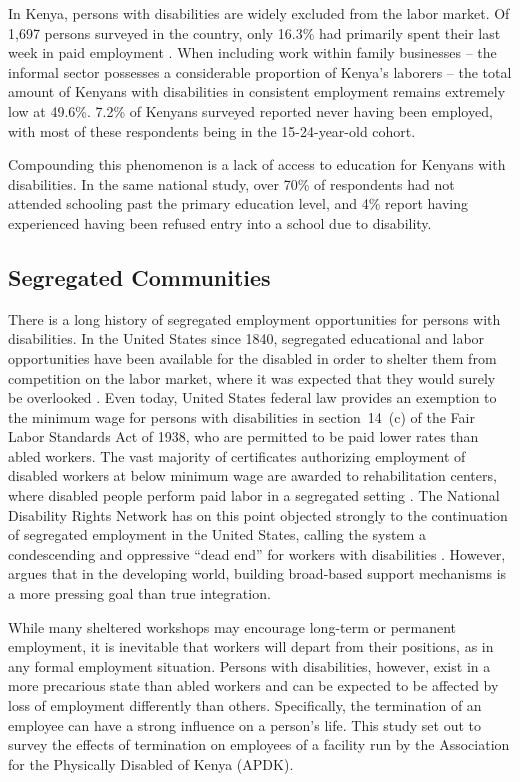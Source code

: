 \documentclass[american]{../../../coursework}
\begin{document}
In Kenya, persons with disabilities are widely excluded from the labor market.
Of 1,697 persons surveyed in the country, only 16.3\% had primarily spent
their last week in paid employment \parencite{2008}. When including work
within family businesses -- the informal sector possesses a considerable
proportion of Kenya's laborers \parencite{Livingstone1991} -- the total amount
of Kenyans with disabilities in consistent employment remains extremely low at
49.6\%. 7.2\% of Kenyans surveyed reported never having been employed, with
most of these respondents being in the 15-24-year-old cohort.

Compounding this phenomenon is a lack of access to education for Kenyans with
disabilities. In the same national study, over 70\% of respondents had not
attended schooling past the primary education level, and 4\% report having
experienced having been refused entry into a school due to disability. 

\subsection{Segregated Communities}

There is a long history of segregated employment opportunities for persons
with disabilities. In the United States since 1840, segregated educational and
labor opportunities have been available for the disabled in order to shelter
them from competition on the labor market, where it was expected that they
would surely be overlooked \parencite{2011}. Even today, United States federal
law provides an exemption to the minimum wage for persons with disabilities in
section~14~(c) of the Fair Labor Standards Act of 1938, who are permitted to
be paid lower rates than abled workers. The vast majority of certificates
authorizing employment of disabled workers at below minimum wage are awarded
to rehabilitation centers, where disabled people perform paid labor in a
segregated setting \parencite{1991}. The National Disability Rights Network
has on this point objected strongly to the continuation of segregated
employment in the United States, calling the system a condescending and
oppressive ``dead end'' for workers with disabilities \parencite[32]{2011}.
However, \textcite{Cobley2012} argues that in the developing world, building
broad-based support mechanisms is a more pressing goal than true integration.

While many sheltered workshops may encourage long-term or permanent
employment, it is inevitable that workers will depart from their positions, as
in any formal employment situation. Persons with disabilities, however, exist
in a more precarious state than abled workers and can be expected to be
affected by loss of employment differently than others. Specifically, the
termination of an employee can have a strong influence on a person's life.
This study set out to survey the effects of termination on employees of a
facility run by the Association for the Physically Disabled of Kenya (APDK).
\end{document}
